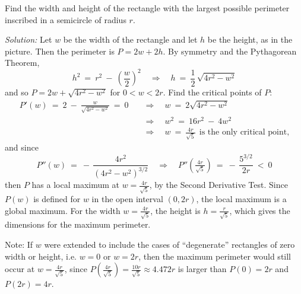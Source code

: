 \divider
\newpage
\begin{exmp}\label{exmp:minmax7}
\noindent Find the width and height of the rectangle with the
largest possible perimeter inscribed in a semicircle of radius $r$.
 \par\noindent\emph{Solution:} Let $w$ be the width of the rectangle and let
 $h$ be the height, as in the picture. Then the perimeter is $P= 2w + 2h$.
 By symmetry and the Pythagorean Theorem,
\[
h^2 ~=~ r^2 ~-~ \left(\frac{w}{2}\right)^2 \quad\Rightarrow\quad
h ~=~ \frac{1}{2}\,\sqrt{4r^2 - w^2}
\]
and so $P = 2w + \sqrt{4r^2 - w^2}$ for $0 < w < 2r$. Find the critical points
of $P$:
\begin{align*}
P'(w) ~=~ 2 ~-~ \frac{w}{\sqrt{4r^2 - w^2}} ~=~ 0 \quad&\Rightarrow\quad
w ~=~ 2\sqrt{4r^2 - w^2}\\[2pt]
&\Rightarrow\quad w^2 ~=~ 16r^2 ~-~ 4w^2\\[2pt]
&\Rightarrow\quad w ~=~ \frac{4r}{\sqrt{5}} ~~\text{is the only critical point,}
\end{align*}
and since
\[
P''(w) ~=~ -\,\frac{4r^2}{(4r^2 - w^2)^{3/2}} \quad\Rightarrow\quad
P''\left(\tfrac{4r}{\sqrt{5}}\right) ~=~ -\,\frac{5^{3/2}}{2r} ~<~ 0
\]
then $P$ has a local maximum at $w=\frac{4r}{\sqrt{5}}$, by the Second
Derivative Test. Since $P(w)$ is defined for $w$ in the open interval $(0,2r)$,
the local maximum is a global maximum. For the width $w=\frac{4r}{\sqrt{5}}$, the
height is $h=\frac{r}{\sqrt{5}}$, which gives the dimensions for the maximum
perimeter.\vspace{2mm}

\par\noindent Note: If $w$ were extended to include the cases of ``degenerate''
rectangles of zero width or height, i.e. $w=0$ or $w=2r$, then the maximum
perimeter would still occur at $w=\tfrac{4r}{\sqrt{5}}$, since
$P\left(\tfrac{4r}{\sqrt{5}}\right) = \tfrac{10r}{\sqrt{5}} \approx 4.472r$
is larger than $P(0) = 2r$ and $P(2r) = 4r$.
\end{exmp}
\divider
\vspace{2mm}


